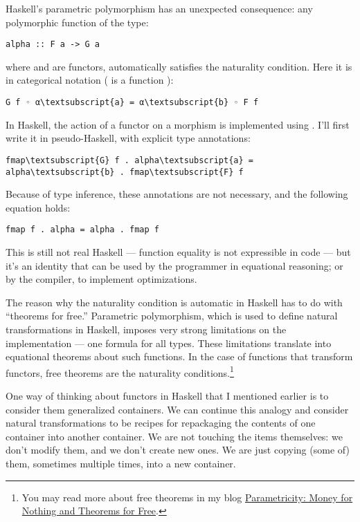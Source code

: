 Haskell's parametric polymorphism has an unexpected consequence: any
polymorphic function of the type:

\begin{Verbatim}[commandchars=\\\{\}]
alpha :: F a -> G a
\end{Verbatim}
where  and  are functors, automatically satisfies
the naturality condition. Here it is in categorical notation (
is a function ):

\begin{Verbatim}[commandchars=\\\{\}]
G f ◦ α\textsubscript{a} = α\textsubscript{b} ◦ F f
\end{Verbatim}
In Haskell, the action of a functor  on a morphism 
is implemented using . I'll first write it in
pseudo-Haskell, with explicit type annotations:

\begin{Verbatim}[commandchars=\\\{\}]
fmap\textsubscript{G} f . alpha\textsubscript{a} = alpha\textsubscript{b} . fmap\textsubscript{F} f
\end{Verbatim}
Because of type inference, these annotations are not necessary, and the
following equation holds:

\begin{Verbatim}[commandchars=\\\{\}]
fmap f . alpha = alpha . fmap f
\end{Verbatim}
This is still not real Haskell --- function equality is not expressible
in code --- but it's an identity that can be used by the programmer in
equational reasoning; or by the compiler, to implement optimizations.

The reason why the naturality condition is automatic in Haskell has to
do with ``theorems for free.'' Parametric polymorphism, which is used to
define natural transformations in Haskell, imposes very strong
limitations on the implementation --- one formula for all types. These
limitations translate into equational theorems about such functions. In
the case of functions that transform functors, free theorems are the
naturality conditions.\footnote{
You may read more about free theorems in my
blog \href{https://bartoszmilewski.com/2014/09/22/parametricity-money-for-nothing-and-theorems-for-free/}{Parametricity:
Money for Nothing and Theorems for Free}.}

One way of thinking about functors in Haskell that I mentioned earlier
is to consider them generalized containers. We can continue this analogy
and consider natural transformations to be recipes for repackaging the
contents of one container into another container. We are not touching
the items themselves: we don't modify them, and we don't create new
ones. We are just copying (some of) them, sometimes multiple times, into
a new container.

